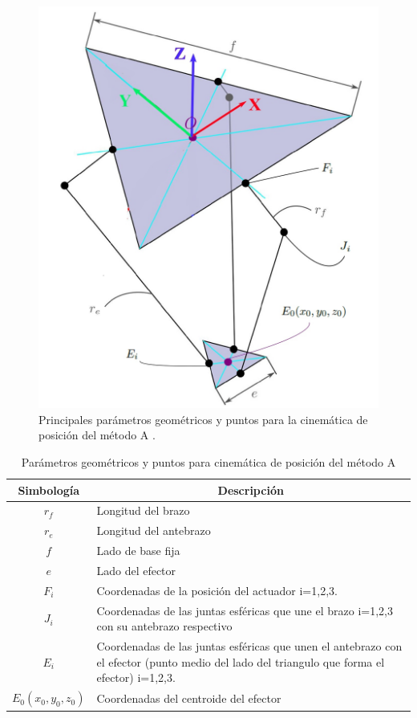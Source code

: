         \begin{figure}[htb]
             \centering
             \includegraphics[width=0.45\linewidth]{Main/Chapter4/Images4/DIBUJO3.jpg}
              \caption{Principales parámetros geométricos y puntos para la cinemática de posición del método A \cite{Diseno_e_implementacion_de_un_sistema_de_control_para_la_representacion_grafica_a_partir_de_imagenes}.}
              \label{f:Cap4_Metodo_A_Modelacion_Cinematica_Posicion_2}
        \end{figure}
        

        \begingroup
            \renewcommand{\arraystretch}{1.3}
            \begin{table}[H]
            \centering
            \begin{tabular}{c m{12cm}}
               \hline
               \textbf{Simbología}  & \multicolumn{1}{c|}{\textbf{Descripción}}  \\\hline\hline
                $r_{f}$  & Longitud del brazo                                    \\\hline
               $r_{e}$  & Longitud del antebrazo                                \\\hline               
               $f$  & Lado de base fija                                         \\\hline
               $e$  & Lado del efector                                          \\\hline
               $F_{i}$  & Coordenadas de la posición del actuador i=1,2,3.    \\\hline
               $J_{i}$  & Coordenadas de las juntas esféricas que une el brazo i=1,2,3 con su antebrazo respectivo   \\\hline
               $E_{i}$  & Coordenadas de las juntas esféricas que unen el antebrazo con el efector (punto medio del lado
               del triangulo que forma el efector) i=1,2,3.    \\\hline
               $E_{0}(x_{0},y_{0},z_{0})$  & Coordenadas del centroide del efector   \\\hline               
            \end{tabular}
            \caption{Parámetros geométricos y puntos para cinemática de posición del método A}
            \label{tab:cap4_tabla_2}
        \end{table}
        \endgroup
        
